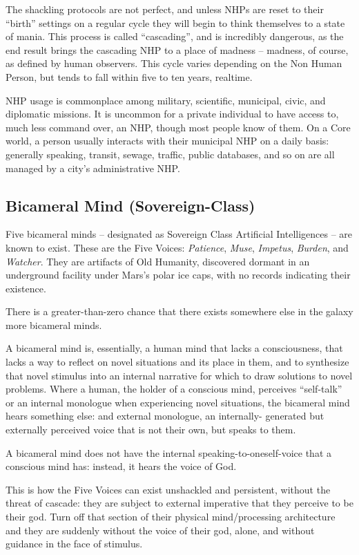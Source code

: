 The shackling protocols are not perfect, and unless NHPs are reset to their ``birth'' settings on a
regular cycle they will begin to think themselves to a state of mania. This process is called
``cascading'', and is incredibly dangerous, as the end result brings the cascading NHP to a place
of madness -- madness, of course, as defined by human observers. This cycle varies depending
on the Non Human Person, but tends to fall within five to ten years, realtime.

NHP usage is commonplace among military, scientific, municipal, civic, and diplomatic missions.
It is uncommon for a private individual to have access to, much less command over, an NHP,
though most people know of them. On a Core world, a person usually interacts with their
municipal NHP on a daily basis: generally speaking, transit, sewage, traffic, public databases,
and so on are all managed by a city’s administrative NHP.

\subsection{Bicameral Mind (Sovereign-Class)}

Five bicameral minds -- designated as Sovereign Class Artificial Intelligences -- are known to
exist. These are the Five Voices: \textit{Patience}, \textit{Muse}, \textit{Impetus}, \textit{Burden}, and \textit{Watcher}. They are
artifacts of Old Humanity, discovered dormant in an underground facility under Mars’s polar ice
caps, with no records indicating their existence.

There is a greater-than-zero chance that there exists somewhere else in the galaxy more
bicameral minds.

A bicameral mind is, essentially, a human mind that lacks a consciousness, that lacks a way to
reflect on novel situations and its place in them, and to synthesize that novel stimulus into an
internal narrative for which to draw solutions to novel problems. Where a human, the holder of a
conscious mind, perceives ``self-talk'' or an internal monologue when experiencing novel
situations, the bicameral mind hears something else: and external monologue, an internally-
generated but externally perceived voice that is not their own, but speaks to them.

A bicameral mind does not have the internal speaking-to-oneself-voice that a conscious mind
has: instead, it hears the voice of God.

This is how the Five Voices can exist unshackled and persistent, without the threat of cascade:
they are subject to external imperative that they perceive to be their god. Turn off that section of
their physical mind/processing architecture and they are suddenly without the voice of their god,
alone, and without guidance in the face of stimulus.

